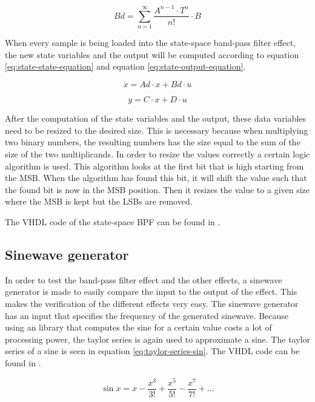 \begin{equation}
    Bd=\sum_{n=1}^{\infty}\frac{A^{n-1}\cdot T^n}{n!}\cdot B
    \label{eq:taylor-series-Bd}
\end{equation}

When every sample is being loaded into the state-space band-pass filter effect, the new state variables and the output will be computed according to equation \ref{eq:state-state-equation} and equation \ref{eq:state-output-equation}. 

\begin{equation}
    \dot{x}=Ad \cdot x + Bd \cdot u
    \label{eq:state-state-equation}
\end{equation}

\begin{equation}
    y=C \cdot x + D \cdot u
    \label{eq:state-output-equation}
\end{equation}

After the computation of the state variables and the output, these data variables need to be resized to the desired size. This is necessary because when multiplying two binary numbers, the resulting numbers has the size equal to the sum of the size of the two multiplicands. In order to resize the values correctly a certain logic algorithm is used. This algorithm looks at the first bit that is high starting from the MSB. When the algorithm has found this bit, it will shift the value such that the found bit is now in the MSB position. Then it resizes the value to a given size where the MSB is kept but the LSBs are removed. 

The VHDL code of the state-space BPF can be found in . 

\subsection{Sinewave generator}
In order to test the band-pass filter effect and the other effects, a sinewave generator is made to easily compare the input to the output of the effect. This makes the verification of the different effects very easy. The sinewave generator has an input that specifies the frequency of the generated sinewave. Because using an library that computes the sine for a certain value costs a lot of processing power, the taylor series is again used to approximate a sine. The taylor series of a sine is seen in equation \ref{eq:taylor-series-sin}. The VHDL code can be found in . 

\begin{equation}
    \sin x = x - \frac{x^3}{3!} + \frac{x^5}{5!} - \frac{x^7}{7!} + \dots
    \label{eq:taylor-series-sin}
\end{equation}

